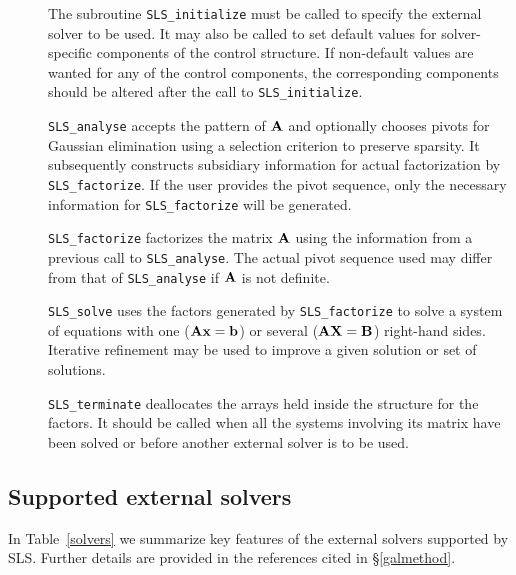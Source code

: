 \documentclass{galahad}
\newcommand{\packagename}{SLS}
\begin{document}
\begin{description}

\item[] The subroutine {\tt \packagename\_initialize} must be called to
specify the external solver to be used.
It may also be called to set default values
for solver-specific components of the control structure.
If non-default values are
wanted for any of the control components, the corresponding components
should be altered after the call to {\tt \packagename\_initialize}.

\item[] {\tt \packagename\_analyse} accepts the pattern of ${\mathbf{A}}$
 and optionally chooses pivots
 for Gaussian elimination using a selection criterion to preserve
 sparsity.  It subsequently constructs subsidiary information for
 actual factorization by {\tt \packagename\_factorize}. If the user provides
 the pivot sequence, only the necessary information for
 {\tt \packagename\_factorize} will be generated.

\item[] {\tt \packagename\_factorize} factorizes the matrix ${\mathbf{A}}$ using the
 information
 from a previous call to {\tt \packagename\_analyse}. The actual pivot sequence
 used may differ from that of {\tt \packagename\_analyse} if ${\mathbf{A}}$ is not
definite.

\item[] {\tt \packagename\_solve} uses the factors generated by
  {\tt \packagename\_factorize} to
  solve a system of equations with one (${\mathbf{A}} {\mathbf{x}} = {\mathbf{b}}$)
  or several (${\mathbf{A}} {\mathbf{X}} = {\mathbf{B}}$) right-hand sides.
  Iterative refinement may be used to improve a given solution
  or set of solutions.

\item[] {\tt \packagename\_terminate} deallocates the arrays held inside the
  structure for the factors. It should be called
  when all the systems involving its matrix have been solved
  or before another external solver is to be used.
\end{description}

\subsection{Supported external solvers}

In Table~\ref{solvers} we summarize key features of
the external solvers supported by \packagename. Further details
are provided in the references cited in \S\ref{galmethod}.
\end{document}
